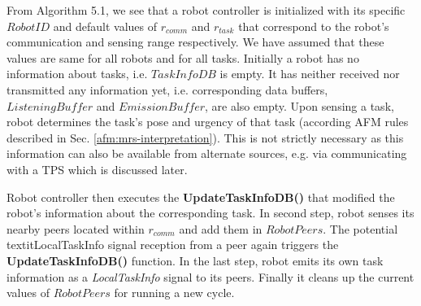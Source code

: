 From Algorithm 5.1, we see that a robot controller is initialized with its specific $RobotID$ and default values of $r_{comm}$ and $r_{task}$ that correspond to the robot's communication and sensing range respectively. We have assumed that these values are same for all robots and for all tasks. Initially a robot has no information about tasks, i.e. {$TaskInfoDB$} is empty. It has neither received nor transmitted any information yet, i.e. corresponding data buffers, $ListeningBuffer$ and $EmissionBuffer$, are also empty. Upon sensing a task, robot determines the task's pose and urgency of that task (according AFM rules described in Sec. \ref{afm:mrs-interpretation}). This is not strictly necessary as this information can also be available from alternate sources, e.g. via communicating with a TPS which is discussed later.

Robot controller then executes the \textbf{UpdateTaskInfoDB()} that modified the robot's information about the corresponding task. In second step, robot senses its nearby peers located within $r_{comm}$ and add them in $RobotPeers$. The potential textit{LocalTaskInfo} signal reception from a  peer again triggers the \textbf{UpdateTaskInfoDB()} function. In the last step, robot emits its own task information as a \textit{LocalTaskInfo} signal to its peers. Finally it cleans up the current values of $RobotPeers$ for running a new cycle.
%
